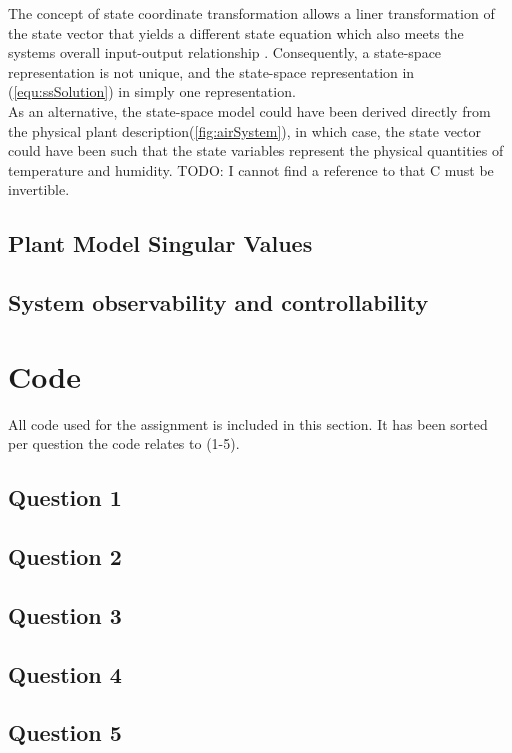 \documentclass[a4paper, titlepage]{article}
\begin{document}
The concept of state coordinate transformation allows a liner transformation of the state vector that yields a different state equation which also meets the systems overall input-output relationship \citep[p.~72]{williams07}.  Consequently, a state-space representation is not unique, and the state-space representation in (\ref{equ:ssSolution}) in simply one representation.\\

As an alternative, the state-space model could have been derived directly from the physical plant description(\ref{fig:airSystem}), in which case, the state vector could have been such that the state variables represent the physical quantities of temperature and humidity. 
TODO: I cannot find a reference to that C must be invertible.\\

\subsection{Plant Model Singular Values}

\subsection{System observability and controllability}

\clearpage


\clearpage

\appendix

\section{Code}
All code used for the assignment is included in this section.
It has been sorted per question the code relates to (1-5).

\subsection{Question 1}

\clearpage

\subsection{Question 2}

\clearpage

\subsection{Question 3}

\clearpage

\subsection{Question 4}

\clearpage

\subsection{Question 5}

\clearpage
\end{document}
